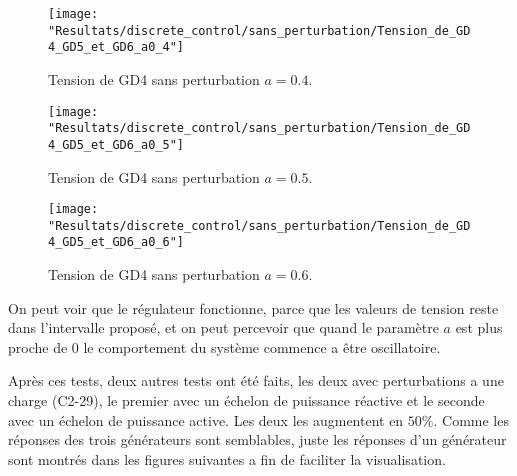  \vspace{2em}
 \begin{minipage}{.475\textwidth}
 \begin{figure}[H]
 	\begin{center}
 		\captionsetup{justification=centering,margin=.5cm}	
 		\texttt{[image: "Resultats/discrete\_control/sans\_perturbation/Tension\_de\_GD4\_GD5\_et\_GD6\_a0\_4"]}
 		\caption{Tension de GD4 sans perturbation $ a =0.4$.}
 		\label{fig:Tension_de_GD4_GD5_et_GD6_a0_4}
 	\end{center}
 \end{figure}
\end{minipage}
 \begin{minipage}{.475\textwidth}
 \begin{figure}[H]
 	\begin{center}
 		\captionsetup{justification=centering,margin=.5cm}	
 		\texttt{[image: "Resultats/discrete\_control/sans\_perturbation/Tension\_de\_GD4\_GD5\_et\_GD6\_a0\_5"]}
 		\caption{Tension de GD4 sans perturbation $ a =0.5$.}
 		\label{fig:Tension_de_GD4_GD5_et_GD6_a0_5}
 	\end{center}
 \end{figure}
 \end{minipage}

 \begin{figure}[H]
 	\begin{center}	
 		\texttt{[image: "Resultats/discrete\_control/sans\_perturbation/Tension\_de\_GD4\_GD5\_et\_GD6\_a0\_6"]}
 		\caption{Tension de GD4 sans perturbation $ a =0.6$.}
 		\label{fig:Tension_de_GD4_GD5_et_GD6_a0_6}
 	\end{center}
 \end{figure}
\newpage
On peut voir que le régulateur fonctionne, parce que les valeurs de tension reste dans l'intervalle proposé, et on peut percevoir que quand le paramètre $ a $ est plus proche de $ 0 $ le comportement du système commence a être oscillatoire.

Après ces tests, deux autres tests ont été faits, les deux avec perturbations a une charge (C2-29), le premier avec un échelon de puissance réactive et le seconde avec un échelon de puissance active. Les deux les augmentent en $ 50\% $. Comme les réponses des trois générateurs sont semblables, juste les réponses d'un générateur sont montrés dans les figures suivantes a fin de faciliter la visualisation.


